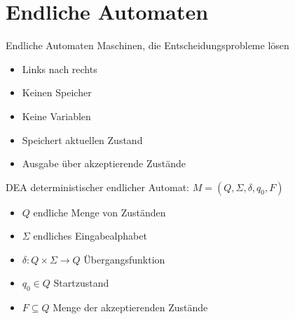 \section*{Endliche Automaten}

\begin{definition}{Endliche Automaten}
    Maschinen, die Entscheidungsprobleme lösen\\
    \begin{minipage}{0.35\linewidth}
        \begin{itemize}
            \item Links nach rechts
            \item Keinen Speicher
            \item Keine Variablen
        \end{itemize}
    \end{minipage}
    \begin{minipage}{0.5\linewidth}
        \begin{itemize}
            \item Speichert aktuellen Zustand
            \item Ausgabe über akzeptierende Zustände
        \end{itemize}
    \end{minipage}
\end{definition}

\begin{definition}{DEA} deterministischer endlicher Automat: $M=(Q, \Sigma, \delta, q_{0}, F)$
    \begin{itemize}
    \item $Q$ endliche Menge von Zuständen
    \item $\Sigma$ endliches Eingabealphabet
    \item $\delta: Q \times \Sigma \rightarrow Q$ Übergangsfunktion
    \item $q_{0} \in Q$ Startzustand
    \item $F \subseteq Q$ Menge der akzeptierenden Zustände
    \end{itemize}
\end{definition}

